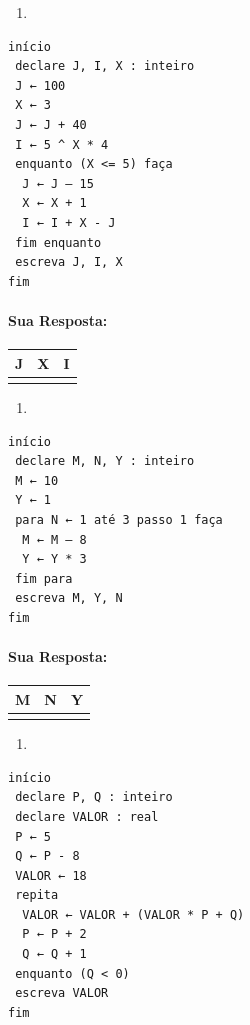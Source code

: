 \documentclass[12pt,a4paper]{article}
\begin{document}
    \begin{enumerate}
\def\labelenumi{\alph{enumi})}
\setcounter{enumi}{2}
\item
\end{enumerate}

\begin{verbatim}
início
 declare J, I, X : inteiro
 J ← 100
 X ← 3
 J ← J + 40
 I ← 5 ^ X * 4
 enquanto (X <= 5) faça
  J ← J – 15
  X ← X + 1
  I ← I + X - J
 fim enquanto
 escreva J, I, X
fim
\end{verbatim}

    \hypertarget{sua-resposta}{%
\paragraph{Sua Resposta:}\label{sua-resposta}}

\begin{longtable}[]{@{}ccc@{}}
\toprule
J & X & I\tabularnewline
\midrule
\endhead
& &\tabularnewline
\bottomrule
\end{longtable}

    \begin{enumerate}
\def\labelenumi{\alph{enumi})}
\setcounter{enumi}{3}
\item
\end{enumerate}

\begin{verbatim}
início
 declare M, N, Y : inteiro
 M ← 10
 Y ← 1
 para N ← 1 até 3 passo 1 faça
  M ← M – 8
  Y ← Y * 3
 fim para
 escreva M, Y, N
fim
\end{verbatim}

    \hypertarget{sua-resposta}{%
\paragraph{Sua Resposta:}\label{sua-resposta}}

\begin{longtable}[]{@{}ccc@{}}
\toprule
M & N & Y\tabularnewline
\midrule
\endhead
& &\tabularnewline
\bottomrule
\end{longtable}

    \begin{enumerate}
\def\labelenumi{\alph{enumi})}
\setcounter{enumi}{4}
\item
\end{enumerate}

\begin{verbatim}
início
 declare P, Q : inteiro
 declare VALOR : real
 P ← 5
 Q ← P - 8
 VALOR ← 18
 repita
  VALOR ← VALOR + (VALOR * P + Q)
  P ← P + 2
  Q ← Q + 1
 enquanto (Q < 0)
 escreva VALOR
fim
\end{verbatim}
\end{document}
